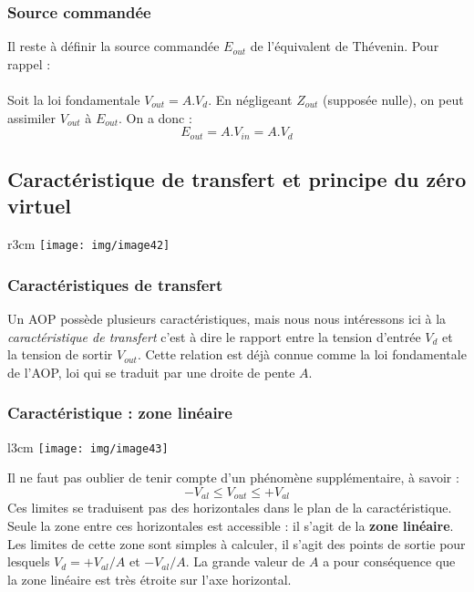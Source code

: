
\subsubsection{Source commandée}
Il reste à définir la source commandée $E_{out}$ de l'équivalent de Thévenin. Pour rappel :\\

\ \\

Soit la loi fondamentale $V_{out} = A.V_d$. En négligeant $Z_{out}$ (supposée nulle), on peut assimiler $V_{out}$ à $E_{out}$. On a donc : 
\begin{equation}
	E_{out} = A.V_{in} = A.V_d
\end{equation}

\subsection{Caractéristique de transfert et principe du zéro virtuel}\begin{wrapfigure}[6]{r}{3cm}
\vspace{-1cm}
\texttt{[image: img/image42]}
\end{wrapfigure}
\subsubsection{Caractéristiques de transfert}

Un AOP possède plusieurs caractéristiques, mais nous nous intéressons ici à la \textit{caractéristique de transfert} c'est à dire le rapport entre la tension d'entrée $V_d$ et la tension de sortir $V_{out}$. Cette relation est déjà connue comme la loi fondamentale de l'AOP, loi qui se traduit par une droite de pente $A$.

\subsubsection{Caractéristique : zone linéaire}
\begin{wrapfigure}[7]{l}{3cm}
	\texttt{[image: img/image43]}
\end{wrapfigure}
Il ne faut pas oublier de tenir compte d'un phénomène supplémentaire, à savoir :
\begin{equation}
	-V_{al} \leq V_{out} \leq +V_{al}
\end{equation}
Ces limites se traduisent pas des horizontales dans le plan de la caractéristique. Seule la zone entre ces horizontales est accessible : il s'agit de la \textbf{zone linéaire}.\\
Les limites de cette zone sont simples à calculer, il s'agit des points de sortie pour lesquels $V_{d} = +V_{al}/A$ et $-V_{al}/A$. La grande valeur de $A$ a pour conséquence que la zone linéaire est très étroite sur l'axe horizontal.

